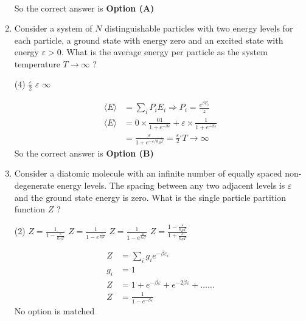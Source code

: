 \begin{enumerate}
\begin{answer}
\begin{align*}
\end{align*}
So the correct answer is \textbf{Option (A)}
\end{answer}
\item 	Consider a system of $N$ distinguishable particles with two energy levels for each particle, a ground state with energy zero and an excited state with energy $\varepsilon>0$. What is the average energy per particle as the system temperature $T \rightarrow \infty$ ?
{}
\begin{tasks}(4)
\task[\textbf{B.}]  $\frac{\varepsilon}{2}$
\task[\textbf{C.}] $\varepsilon$
\task[\textbf{D.}] $\infty$
\end{tasks}
\begin{answer}
\begin{align*}
\langle E\rangle&=\sum_{i} P_{i} E_{i} \Rightarrow P_{i}=\frac{e^{\beta E_{i}}}{z}\\
\langle E\rangle&=0 \times \frac{01}{1+e^{-\beta \varepsilon}}+\varepsilon \times \frac{1}{1+e^{-\beta \varepsilon}}\\
&=\frac{\varepsilon}{1+e^{-\varepsilon / k_{B} T}}=\frac{\varepsilon}{2}\text{`}T \rightarrow \infty
\end{align*}
So the correct answer is \textbf{Option (B)}
\end{answer}
\item Consider a diatomic molecule with an infinite number of equally spaced non-degenerate energy levels. The spacing between any two adjacent levels is $\varepsilon$ and the ground state energy is zero. What is the single particle partition function $Z$ ?
{}
\begin{tasks}(2)
\task[\textbf{A.}] $Z=\frac{1}{1-\frac{\varepsilon}{k_{B} T}}$
\task[\textbf{B.}] $Z=\frac{1}{1-e^{\frac{\varepsilon}{k_{\mathrm{B}} T}}}$
\task[\textbf{C.}] $Z=\frac{1}{1-e^{\frac{2 \varepsilon}{k_{B} T}}}$
\task[\textbf{D.}] $Z=\frac{1-\frac{\varepsilon}{k_{B} T}}{1+\frac{\varepsilon}{k_{B} T}}$
\end{tasks}
\begin{answer}
\begin{align*}
Z&=\sum_{i} g_{i} e^{-\beta \varepsilon_{i}}\\
g_{i}&=1\\
Z&=1+e^{-\beta \varepsilon}+e^{-2 \beta \varepsilon}+\ldots \ldots\\
Z&=\frac{1}{1-e^{-\beta \varepsilon}}
\end{align*}
No option is matched
\end{answer}	
	
	
	
	
	
	
	
\end{enumerate}